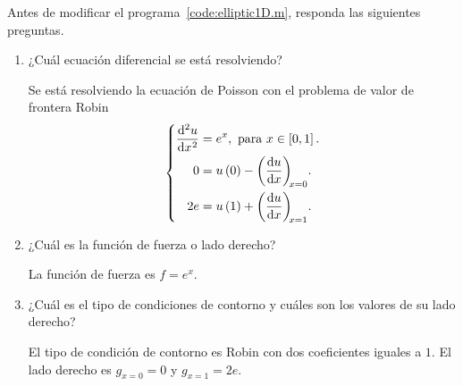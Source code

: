 \begin{problem}

Antes de modificar el programa~\ref{code:elliptic1D.m}, responda las
siguientes preguntas.

\begin{enumerate}
    \item

          ¿Cuál ecuación diferencial se está resolviendo?

          \begin{solution}
              Se está resolviendo la ecuación de Poisson con el
              problema de valor de frontera Robin~\cite{CORBINO2020112326}
              \begin{equation}\label{eq:poisson1drobindconditions}
                  \left\{
                  \begin{aligned}
                      \diff[2]{u}{x}
                       & =e^{x},
                      \text{ para }x\in\left[0,1\right].     \\
                      0
                       & = u\left(0\right)-\diff{u}{x}[x=0]. \\
                      2e
                       & =u\left(1\right)+\diff{u}{x}[x=1].  \\
                  \end{aligned}
                  \right.
              \end{equation}
          \end{solution}

    \item

          ¿Cuál es la función de fuerza o lado derecho?

          \begin{solution}
              La función de fuerza es $f=e^{x}$.
          \end{solution}

    \item

          ¿Cuál es el tipo de condiciones de contorno y cuáles son
          los valores de su lado derecho?

          \begin{solution}
              El tipo de condición de contorno es Robin con dos
              coeficientes iguales a $1$.
              El lado derecho es $g_{x=0}=0$ y $g_{x=1}=2e$.
          \end{solution}


\end{enumerate}
\end{problem}
